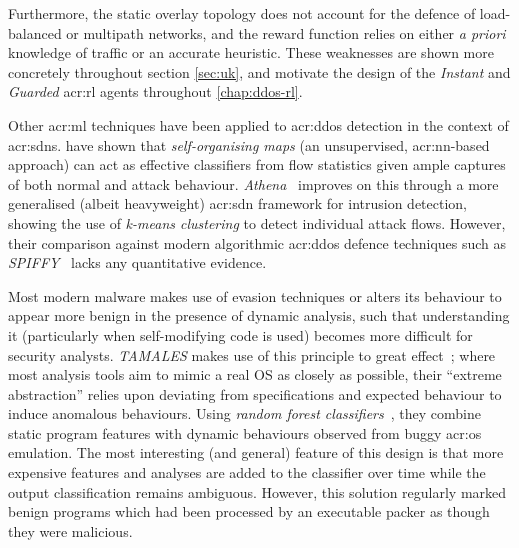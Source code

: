 Furthermore, the static overlay topology does not account for the defence of load-balanced or multipath networks, and the reward function relies on either \emph{a priori} knowledge of traffic or an accurate heuristic.
These weaknesses are shown more concretely throughout section \cref{sec:uk}, and motivate the design of the \emph{Instant} and \emph{Guarded} \gls{acr:rl} agents throughout \cref{chap:ddos-rl}.

Other \gls{acr:ml} techniques have been applied to \gls{acr:ddos} detection in the context of \glspl{acr:sdn}.
\textcite{DBLP:conf/lcn/BragaMP10} have shown that \emph{self-organising maps} (an unsupervised, \gls{acr:nn}-based approach) can act as effective classifiers from flow statistics given ample captures of both normal and attack behaviour.
\emph{Athena}~\parencite{DBLP:conf/dsn/LeeKSPY17} improves on this through a more generalised (albeit heavyweight) \gls{acr:sdn} framework for intrusion detection, showing the use of \emph{k-means clustering} to detect individual attack flows.
However, their comparison against modern algorithmic \gls{acr:ddos} defence techniques such as \emph{SPIFFY}~\parencite{DBLP:conf/ndss/KangGS16} lacks any quantitative evidence.

Most modern malware makes use of evasion techniques or alters its behaviour to appear more benign in the presence of dynamic analysis, such that understanding it (particularly when self-modifying code is used) becomes more difficult for security analysts.
\emph{TAMALES} makes use of this principle to great effect~\parencite{DBLP:conf/acsac/CoptyDEEMZ18}; where most analysis tools aim to mimic a real OS as closely as possible, their ``extreme abstraction'' relies upon deviating from specifications and expected behaviour to induce anomalous behaviours.
Using \emph{random forest classifiers}~\parencite{DBLP:journals/ml/Breiman01}, they combine static program features with dynamic behaviours observed from buggy \gls{acr:os} emulation.
The most interesting (and general) feature of this design is that more expensive features and analyses are added to the classifier over time while the output classification remains ambiguous.
However, this solution regularly marked benign programs which had been processed by an executable packer as though they were malicious.

